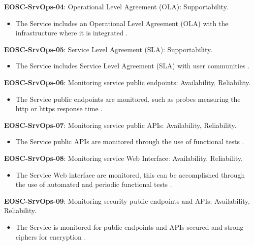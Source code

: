 \textbf{EOSC-SrvOps-04}: Operational Level Agreement (OLA): Supportability.

\begin{itemize}
    \item The Service includes an Operational Level Agreement (OLA) with the infrastructure where it is integrated \cite{orviz_fernandez_eosc-synergy_2020}.
\end{itemize}

\textbf{EOSC-SrvOps-05}: Service Level Agreement (SLA): Supportability.

\begin{itemize}
    \item The Service includes Service Level Agreement (SLA) with user communities \cite{orviz_fernandez_eosc-synergy_2020}.
\end{itemize}

\textbf{EOSC-SrvOps-06}: Monitoring service public endpoints: Availability, Reliability.

\begin{itemize}
    \item The Service public endpoints are monitored, such as probes measuring the http or https response time \cite{orviz_fernandez_eosc-synergy_2020}.
\end{itemize}

\textbf{EOSC-SrvOps-07}: Monitoring service public APIs: Availability, Reliability.

\begin{itemize}
    \item The Service public APIs are monitored through the use of functional tests \cite{orviz_fernandez_eosc-synergy_2020}.
\end{itemize}

\textbf{EOSC-SrvOps-08}: Monitoring service Web Interface: Availability, Reliability.

\begin{itemize}
    \item The Service Web interface are monitored, this can be accomplished through the use of automated and periodic functional tests \cite{orviz_fernandez_eosc-synergy_2020}.
\end{itemize}

\textbf{EOSC-SrvOps-09}: Monitoring security public endpoints and APIs: Availability, Reliability.

\begin{itemize}
    \item The Service is monitored for public endpoints and APIs secured and strong ciphers for encryption \cite{orviz_fernandez_eosc-synergy_2020}.
\end{itemize}

